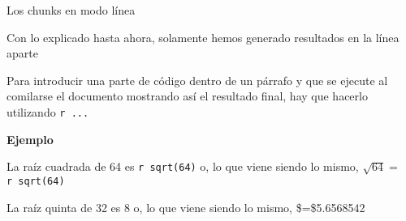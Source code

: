\documentclass[
  ignorenonframetext,
]{beamer}
\begin{document}
\begin{frame}[fragile]{Los chunks en modo línea}
\protect\hypertarget{los-chunks-en-modo-luxednea-1}{}

Con lo explicado hasta ahora, solamente hemos generado resultados en la
línea aparte

Para introducir una parte de código dentro de un párrafo y que se
ejecute al comilarse el documento mostrando así el resultado final, hay
que hacerlo utilizando \texttt{\textasciigrave{}r\ ...\textasciigrave{}}

\textbf{Ejemplo}

La raíz cuadrada de 64 es
\texttt{\textasciigrave{}r\ sqrt(64)\textasciigrave{}} o, lo que viene
siendo lo mismo,
\(\sqrt{64}=\)\texttt{\textasciigrave{}r\ sqrt(64)\textasciigrave{}}

La raíz quinta de 32 es 8 o, lo que viene siendo lo mismo,
\$=\$5.6568542

\end{frame}
\end{document}
